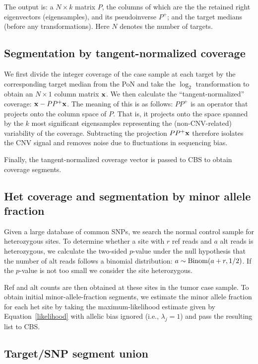 \documentclass[nofootinbib,amssymb,amsmath]{revtex4}
\begin{document}
The output is: a $N \times k$ matrix $P$, the columns of which are the the retained right eigenvectors (eigensamples), and its pseudoinverse $P^+$; and the target medians (before any transformations).  Here $N$ denotes the number of targets.

\subsection{Segmentation by tangent-normalized coverage}
We first divide the integer coverage of the case sample at each target by the corresponding target median from the PoN and take the $\log_2$ transformation to obtain an $N \times 1$ column matrix ${\bf x}$.  We then calculate the ``tangent-normalized'' coverage: ${\bf x} - PP^+ {\bf x}$.  The meaning of this is as follows: $PP^+$ is an operator that projects onto the column space of $P$.  That is, it projects onto the space spanned by the $k$ most significant eigensamples representing the (non-CNV-related) variability of the coverage.  Subtracting the projection $PP^+ {\bf x}$ therefore isolates the CNV signal and removes noise due to fluctuations in sequencing bias.

Finally, the tangent-normalized coverage vector is passed to CBS to obtain coverage segments.

\subsection{Het coverage and segmentation by minor allele fraction}
Given a large database of common SNPs, we search the normal control sample for heterozygous sites.  To determine whether a site with $r$ ref reads and $a$ alt reads is heterozygous, we calculate the two-sided $p$-value under the null hypothesis that the number of alt reads follows a binomial distribution: $a \sim {\rm Binom}(a + r, 1/2)$.  If the $p$-value is not too small we consider the site heterozygous.

Ref and alt counts are then obtained at these sites in the tumor case sample.  To obtain initial minor-allele-fraction segments, we estimate the minor allele fraction for each het site by taking the maximum-likelihood estimate given by Equation~\ref{likelihood} with allelic bias ignored (i.e., $\lambda_j = 1$) and pass the resulting list to CBS.

\subsection{Target/SNP segment union} \label{targetsnp-segment-union}
\end{document}
